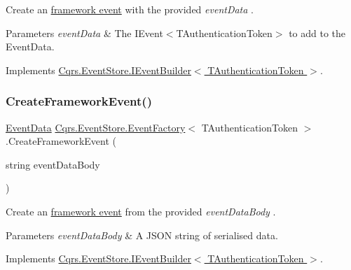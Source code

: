 Create an \hyperlink{}{framework event} with the provided {\itshape event\+Data} . 


\begin{DoxyParams}{Parameters}
{\em event\+Data} & The I\+Event$<$\+T\+Authentication\+Token$>$ to add to the Event\+Data.\\
\hline
\end{DoxyParams}


Implements \hyperlink{interfaceCqrs_1_1EventStore_1_1IEventBuilder_a8ee9560f7b53c67b9946c3b0719eca96_a8ee9560f7b53c67b9946c3b0719eca96}{Cqrs.\+Event\+Store.\+I\+Event\+Builder$<$ T\+Authentication\+Token $>$}.

\mbox{\label{classCqrs_1_1EventStore_1_1EventFactory_adbcf9f3c67cfef3fe894e5fb53e8b800_adbcf9f3c67cfef3fe894e5fb53e8b800}} 
\subsubsection{\texorpdfstring{Create\+Framework\+Event()}{CreateFrameworkEvent()}\hspace{0.1cm}{\footnotesize\ttfamily [3/4]}}
{\footnotesize\ttfamily \hyperlink{classCqrs_1_1Events_1_1EventData}{Event\+Data} \hyperlink{classCqrs_1_1EventStore_1_1EventFactory}{Cqrs.\+Event\+Store.\+Event\+Factory}$<$ T\+Authentication\+Token $>$.Create\+Framework\+Event (\begin{DoxyParamCaption}\item[{string}]{event\+Data\+Body }\end{DoxyParamCaption})}



Create an \hyperlink{}{framework event} from the provided {\itshape event\+Data\+Body} . 


\begin{DoxyParams}{Parameters}
{\em event\+Data\+Body} & A J\+S\+ON string of serialised data.\\
\hline
\end{DoxyParams}


Implements \hyperlink{interfaceCqrs_1_1EventStore_1_1IEventBuilder_a341d5c54ef8a271a8248e0a5266e6228_a341d5c54ef8a271a8248e0a5266e6228}{Cqrs.\+Event\+Store.\+I\+Event\+Builder$<$ T\+Authentication\+Token $>$}.

